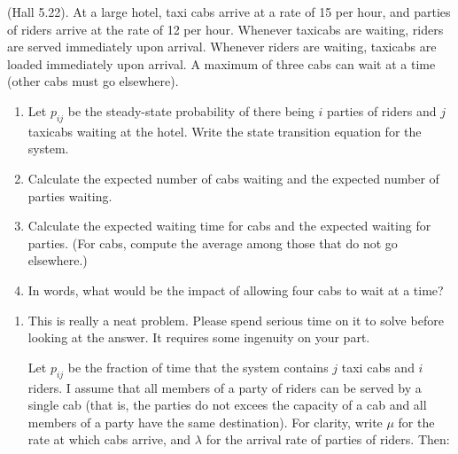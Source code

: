 \begin{question}
  (Hall 5.22). At a large hotel, taxi cabs arrive at a rate of 15 per
  hour, and parties of riders arrive at the rate of 12 per
  hour. Whenever taxicabs are waiting, riders are served immediately
  upon arrival. Whenever riders are waiting, taxicabs are loaded
  immediately upon arrival. A maximum of three cabs can wait at a time (other cabs must go elsewhere).
  \begin{enumerate}
  \item Let $p_{ij}$ be the steady-state probability of there being $i$ parties of riders and $j$ taxicabs waiting at the hotel. Write the state transition equation for the system. 
  \item Calculate the expected number of cabs waiting and the expected number of parties waiting.
  \item Calculate the expected waiting time for cabs and the expected waiting for parties. (For cabs, compute the average among those that do not go elsewhere.)
  \item In words, what would be the impact of allowing four cabs to wait at a time?
  \end{enumerate}
  

    \begin{solution}
      \begin{enumerate}
      \item 
This is really a neat problem. Please spend serious time on it to
solve before looking at the answer. It requires some ingenuity on your part. 

Let $p_{ij}$ be the fraction of time that the system contains
$j$ taxi cabs and $i$ riders. I assume that all members of
a party of riders can be served by a single cab (that is, the parties
do not excees the capacity of a cab and all members of a party have
the same destination). For clarity, write $\mu$ for the rate at
which cabs arrive, and $\lambda$ for the arrival rate of parties
of riders. Then:


\end{enumerate}
\end{solution}
\end{question}
